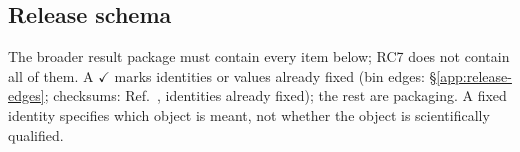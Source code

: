 \subsection{Release schema}
\label{app:release-schema}

The broader result package must contain every item below; RC7 does not contain all of them. A $\checkmark$ marks identities or values already fixed (bin edges: \S\ref{app:release-edges}; checksums: Ref.~\cite{NoteRecords2026}, identities already fixed); the rest are packaging. A fixed identity specifies which object is meant, not whether the object is scientifically qualified.

